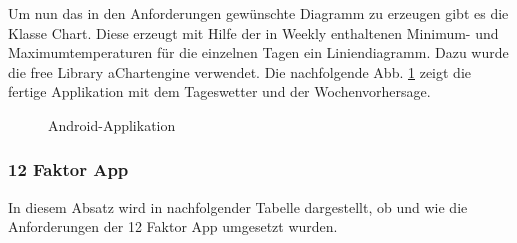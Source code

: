   Um nun das in den Anforderungen gewünschte Diagramm zu erzeugen gibt es die Klasse Chart. Diese erzeugt mit Hilfe der in Weekly enthaltenen Minimum- und Maximumtemperaturen für die einzelnen Tagen ein Liniendiagramm. Dazu wurde die free Library aChartengine verwendet.
Die nachfolgende Abb. \ref{img:AndroidApplikation} zeigt die fertige Applikation mit dem Tageswetter und der Wochenvorhersage.

\begin{figure}[!ht]
\centering
\caption{Android-Applikation}
\label{img:AndroidApplikation}
\end{figure}

\subsubsection{12 Faktor App}\label{web12FactorApp}
In diesem Absatz wird in nachfolgender Tabelle dargestellt, ob und wie die Anforderungen der 12 Faktor App umgesetzt wurden.


